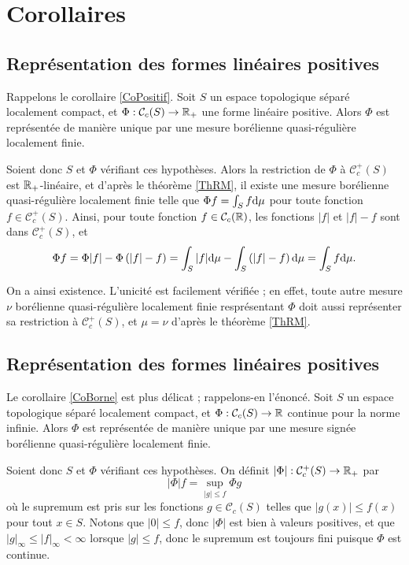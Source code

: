 \documentclass{article}
\begin{document}
\section{Corollaires}
\subsection{Représentation des formes linéaires positives}

Rappelons le corollaire \ref{CoPositif}. Soit $S$ un espace topologique séparé localement compact, et $\Phi:\mathcal C_c(S)\to\mathbb{R}_+$ une forme linéaire positive. Alors $\Phi$ est représentée de manière unique par une mesure borélienne quasi-régulière localement finie.

Soient donc $S$ et $\Phi$ vérifiant ces hypothèses. Alors la restriction de $\Phi$ à $\mathcal C_c^+(S)$ est $\mathbb{R}_+$-linéaire, et d'après le théorème \ref{ThRM}, il existe une mesure borélienne quasi-régulière localement finie telle que $\Phi f=\int_Sf\mathrm{d}\mu$ pour toute fonction $f\in\mathcal C_c^+(S)$. Ainsi, pour toute fonction $f\in\mathcal C_c(\mathbb{R})$, les fonctions $|f|$ et $|f|-f$ sont dans $\mathcal C_c^+(S)$, et
$$\Phi f = \Phi|f|-\Phi\left(|f|-f\right)
         = \int_S|f|\mathrm{d}\mu-\int_S\left(|f|-f\right)\mathrm{d}\mu
         = \int_Sf\mathrm{d}\mu\text.$$

On a ainsi existence. L'unicité est facilement vérifiée ; en effet, toute autre mesure $\nu$ borélienne quasi-régulière localement finie resprésentant $\Phi$ doit aussi représenter sa restriction à $\mathcal C_c^+(S)$, et $\mu=\nu$ d'après le théorème \ref{ThRM}.

\subsection{Représentation des formes linéaires positives}

Le corollaire \ref{CoBorne} est plus délicat ; rappelons-en l'énoncé. Soit $S$ un espace topologique séparé localement compact, et $\Phi:\mathcal C_c(S)\to\mathbb{R}$ continue pour la norme infinie. Alors $\Phi$ est représentée de manière unique par une mesure signée borélienne quasi-régulière localement finie.

Soient donc $S$ et $\Phi$ vérifiant ces hypothèses. On définit $|\Phi|:\mathcal C_c^+(S)\to\mathbb{R}_+$ par
$$|\Phi|f=\sup_{|g|\leq f}\Phi g$$
où le supremum est pris sur les fonctions $g\in\mathcal C_c(S)$ telles que $|g(x)|\leq f(x)$ pour tout $x\in S$. Notons que $|0|\leq f$, donc $|\Phi|$ est bien à valeurs positives, et que $|g|_\infty\leq|f|_\infty<\infty$ lorsque $|g|\leq f$, donc le supremum est toujours fini puisque $\Phi$ est continue.
\end{document}
